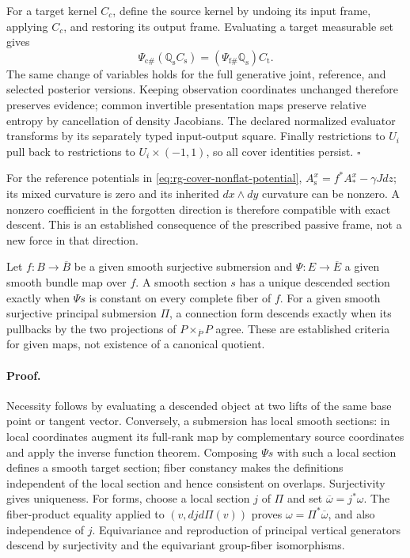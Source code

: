 For a target kernel \(C_c\), define the source kernel by undoing its input
frame, applying \(C_c\), and restoring its output frame. Evaluating a
target measurable set gives
\begin{equation}
 \Psi_{\mathrm c\#}(\mathbb Q_{\mathrm s}C_{\mathrm s})
 = (\Psi_{\mathrm f\#}\mathbb Q_{\mathrm s})C_{\mathrm t}.
\label{eq:rg-cover-base-channel-square}
\end{equation}
The same change of variables holds for the full generative joint, reference,
and selected posterior versions. Keeping observation coordinates unchanged
therefore preserves evidence; common invertible presentation maps preserve
relative entropy by cancellation of density Jacobians. The declared
normalized evaluator transforms by its separately typed input-output square.
Finally restrictions to \(U_i\) pull back to restrictions to
\(U_i\times(-1,1)\), so all cover identities persist. \(\square\)

For the reference potentials in \cref{eq:rg-cover-nonflat-potential},
\(A_{\mathrm s}^x=f^*A_*^x-\gamma J dz\); its mixed curvature is
zero and its inherited \(dx\wedge dy\) curvature can be nonzero. A
nonzero coefficient in the forgotten direction is therefore compatible with
exact descent. This is an established consequence of the prescribed passive
frame, not a new force in that direction. 

Let \(f:B\to\overline B\) be a given smooth surjective submersion and
\(\Psi:E\to\overline E\) a given smooth bundle map over \(f\).
A smooth section \(s\) has a unique descended section exactly when
\(\Psi s\) is constant on every complete fiber of \(f\). For a given
smooth surjective principal submersion \(\Pi\), a connection form descends
exactly when its pullbacks by the two projections of
\(P\times_{\overline P}P\) agree. These are established criteria for
given maps, not existence of a canonical quotient.

\paragraph{Proof.}
Necessity follows by evaluating a descended object at two lifts of the same
base point or tangent vector. Conversely, a submersion has local smooth
sections: in local coordinates augment its full-rank map by complementary
source coordinates and apply the inverse function theorem. Composing
\(\Psi s\) with such a local section defines a smooth target section;
fiber constancy makes the definitions independent of the local section and
hence consistent on overlaps. Surjectivity gives uniqueness. For forms,
choose a local section \(j\) of \(\Pi\) and set
\(\overline\omega=j^*\omega\). The fiber-product equality applied to
\((v,dj d\Pi(v))\) proves
\(\omega=\Pi^*\overline\omega\), and also independence of \(j\).
Equivariance and reproduction of principal vertical generators descend by
surjectivity and the equivariant group-fiber isomorphisms.

